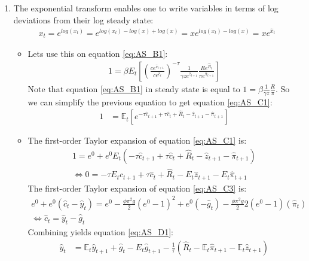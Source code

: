 \begin{enumerate}
\item The exponential transform enables one to write variables in terms of log deviations from their log steady state:
\begin{align*}
x_t = e^{log(x_t)} = e^{log(x_t) - log(x) + log(x)} = x e^{log(x_t)-log(x)} = x e^{\hat{x}_t}
\end{align*}
\begin{itemize}    
    \item Lets use this on equation \eqref{eq:AS_B1}:
    \begin{align*}
    1 = \beta E_t \left[ \left(\frac{c e^{\hat{c}_{t+1}}}{c e^{\hat{c}_t}}\right)^{-\tau} \frac{1}{\gamma z e^{\hat{z}_{t+1}}} \frac{R e^{\hat{R}_t}}{\pi e^{\hat{\pi}_{t+1}}} \right]
    \end{align*}
    Note that equation \eqref{eq:AS_B1} in steady state is equal to $1 = \beta \frac{1}{\gamma z}\frac{R}{\pi}$.
    So we can simplify the previous equation to get equation \eqref{eq:AS_C1}:
    \begin{align*}
    1 &= \mathbb{E}_t \left[e^{-\tau \hat{c}_{t+1} + \tau \hat{c}_{t} + \hat{R}_{t} - \hat{z}_{t+1} - \hat{\pi}_{t+1} }\right]
    \end{align*}    
    \item The first-order Taylor expansion of equation \eqref{eq:AS_C1} is:
    \begin{align*}
    1 = e^0 + e^0 E_t \left(-\tau \hat{c}_{t+1} + \tau \hat{c}_{t} + \hat{R}_{t} - \hat{z}_{t+1} - \hat{\pi}_{t+1}  \right)\\
    \Leftrightarrow
    0 = -\tau E_t \hat{c}_{t+1} + \tau \hat{c}_{t} + \hat{R}_{t} - E_t\hat{z}_{t+1} - E_t \hat{\pi}_{t+1}
    \end{align*}
    The first-order Taylor expansion of equation \eqref{eq:AS_C3} is:
    \begin{align*}
    e^0 + e^0\left(\hat{c}_t - \hat{y}_t\right) = e^0 - \frac{\phi \pi^2 g}{2} (e^0-1)^2 + e^0(-\hat{g}_t) - \frac{\phi \pi^2 g}{2} 2 \left(e^0-1\right)(\hat{\pi}_t)\\
    \Leftrightarrow \hat{c}_t = \hat{y}_t -\hat{g}_t
    \end{align*}
    Combining yields equation \eqref{eq:AS_D1}:
    \begin{align*}
    \hat{y}_{t} &= \mathbb{E}_t \hat{y}_{t+1} + \hat{g}_{t} - E_t\hat{g}_{t+1} - \frac{1}{\tau} \left(\hat{R}_{t}- \mathbb{E}_t \hat{\pi}_{t+1} - \mathbb{E}_t \hat{z}_{t+1}\right)
    \end{align*}
\end{itemize}


\end{enumerate}
